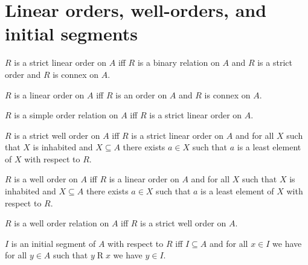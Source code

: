 \section{Linear orders, well-orders, and initial segments}





\begin{definition}\label{strict_linear_order}
    $R$ is a strict linear order on $A$ iff
        $R$ is a binary relation on $A$ and
        $R$ is a strict order and $R$ is connex on $A$.
\end{definition}

\begin{definition}\label{linear_order}
    $R$ is a linear order on $A$ iff
        $R$ is an order on $A$ and $R$ is connex on $A$.
\end{definition}

\begin{abbreviation}\label{simple_order_relation}
    $R$ is a simple order relation on $A$ iff
        $R$ is a strict linear order on $A$.
\end{abbreviation}

\begin{definition}\label{strict_well_order}
    $R$ is a strict well order on $A$ iff
        $R$ is a strict linear order on $A$ and
        for all $X$ such that $X$ is inhabited and $X\subseteq A$ there exists $a\in X$ such that
            $a$ is a least element of $X$ with respect to $R$.
\end{definition}

\begin{definition}\label{well_order}
    $R$ is a well order on $A$ iff
        $R$ is a linear order on $A$ and
        for all $X$ such that $X$ is inhabited and $X\subseteq A$ there exists $a\in X$ such that
            $a$ is a least element of $X$ with respect to $R$.
\end{definition}

\begin{abbreviation}\label{well_order_relation}
    $R$ is a well order relation on $A$ iff
        $R$ is a strict well order on $A$.
\end{abbreviation}

\begin{definition}\label{initial_segment}
    $I$ is an initial segment of $A$ with respect to $R$ iff
        $I\subseteq A$ and for all $x\in I$ we have for all $y\in A$
            such that $y\mathrel{R}x$ we have $y\in I$.
\end{definition}


